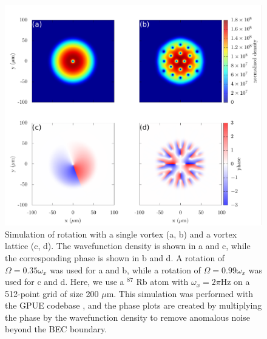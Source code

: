 \begin{figure}

\includegraphics[width=\textwidth]{data/splitop/rot/WIP.pdf}

\caption{
Simulation of rotation with a single vortex (a, b) and a vortex lattice (c, d).
The wavefunction density is shown in a and c, while the corresponding phase is shown in b and d.
A rotation of $\Omega = 0.35\omega_x$ was used for a and b, while a rotation of $\Omega = 0.99\omega_x$ was used for c and d.
Here, we use a $^87$ Rb atom with $\omega_x = 2\pi$Hz on a 512-point grid of size 200 $\mu$m.
This simulation was performed with the GPUE codebase \cite{schloss2018}, and the phase plots are created by multiplying the phase by the wavefunction density to remove anomalous noise beyond the BEC boundary.
}
\label{fig:rot}
\end{figure}


